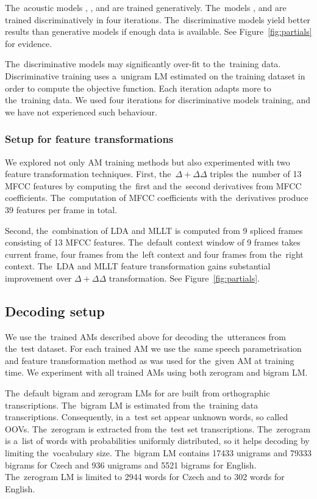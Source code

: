 The~acoustic models , ,  and  are trained generatively.
The~models ,  and  are trained discriminatively in four iterations.
The~discriminative models yield better results than generative models if enough data is available. 
See Figure~\ref{fig:partials} for evidence.

The~discriminative models may significantly over-fit to the~training data.
Discriminative training uses a~unigram \ac{LM} estimated on the training dataset in order to compute the objective function. Each iteration adapts more to the~training data.
We used four iterations for discriminative models training, and we have not experienced such behaviour.

\subsubsection*{Setup for feature transformations}
We explored not only \ac{AM} training methods but also experimented with two feature transformation techniques.
First, the~$\Delta + \Delta\Delta$ triples the~number of 13 \ac{MFCC} features by computing the~first and the~second derivatives from \ac{MFCC} coefficients. 
The~computation of \ac{MFCC} coefficients with the~derivatives produce 39 features per frame in total.

Second, the~combination of \ac{LDA} and \ac{MLLT} is computed from 9 spliced frames consisting of 13 \ac{MFCC} features. 
The~default context window of 9 frames takes current frame, four frames from the~left context and four frames from the~right context.
The~\ac{LDA} and \ac{MLLT} feature transformation gains substantial improvement over $\Delta+\Delta\Delta$ transformation.
See Figure~\ref{fig:partials}.

\subsection*{Decoding setup}
We use the~trained \acp{AM} described above for decoding the~utterances from the~test dataset.
For each trained \ac{AM} we use the~same speech parametrisation and feature transformation method as was used for the~given \ac{AM} at training time.
We experiment with all trained \acp{AM} using both zerogram and bigram \ac{LM}.

The~default bigram and zerogram \acp{LM} for are built from orthographic transcriptions.
The~bigram \ac{LM} is estimated from the~training data transcriptions. 
Consequently, in a~test set appear unknown words, so called \acl{OOV}s.
The~zerogram is extracted from the~test set transcriptions.
The~zerogram is a~list of words with probabilities uniformly distributed, so it helps decoding by limiting the~vocabulary size.
The~bigram \ac{LM} contains 17433 unigrams and 79333 bigrams for Czech and 936 unigrams and 5521 bigrams for English. 
The~zerogram \ac{LM} is limited to 2944 words for Czech and to 302 words for English.

